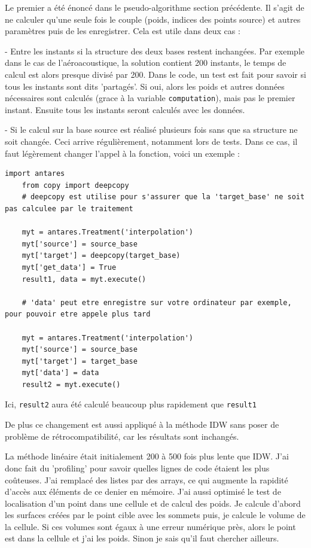 Le premier a été énoncé dans le pseudo-algorithme section précédente. Il s'agit de ne calculer qu'une seule fois le couple (poids, indices des points source) et autres paramètres puis de les enregistrer. Cela est utile dans deux cas :

- Entre les instants si la structure des deux bases restent inchangées. Par exemple dans le cas de l'aéroacoustique, la solution contient 200 instants, le temps de calcul est alors presque divisé par 200. Dans le code, un test est fait pour savoir si tous les instants sont dits 'partagés'. Si oui, alors les poids et autres données nécessaires sont calculés (grace à la variable \texttt{computation}), mais pas le premier instant. Ensuite tous les instants seront calculés avec les données.

- Si le calcul sur la base source est réalisé plusieurs fois sans que sa structure ne soit changée. Ceci arrive régulièrement, notamment lors de tests. Dans ce cas, il faut légèrement changer l'appel à la fonction, voici un exemple :

\begin{lstlisting}[caption=Exemple de réutilisation des données, label={lst:antares}]
    import antares
    from copy import deepcopy
    # deepcopy est utilise pour s'assurer que la 'target_base' ne soit pas calculee par le traitement

    myt = antares.Treatment('interpolation')
    myt['source'] = source_base
    myt['target'] = deepcopy(target_base)
    myt['get_data'] = True
    result1, data = myt.execute()

    # 'data' peut etre enregistre sur votre ordinateur par exemple, pour pouvoir etre appele plus tard

    myt = antares.Treatment('interpolation')
    myt['source'] = source_base
    myt['target'] = target_base
    myt['data'] = data
    result2 = myt.execute()
\end{lstlisting}

Ici, \texttt{result2} aura été calculé beaucoup plus rapidement que \texttt{result1}

De plus ce changement est aussi appliqué à la méthode IDW sans poser de problème de rétrocompatibilité, car les résultats sont inchangés.

\vspace{0.5cm}

La méthode linéaire était initialement 200 à 500 fois plus lente que IDW. J'ai donc fait du 'profiling' pour savoir quelles lignes de code étaient les plus coûteuses. J'ai remplacé des listes par des arrays, ce qui augmente la rapidité d'accès aux éléments de ce denier en mémoire.
J'ai aussi optimisé le test de localisation d'un point dans une cellule et de calcul des poids.
Je calcule d'abord les surfaces créées par le point cible avec les sommets puis, je calcule le volume de la cellule. Si ces volumes sont égaux à une erreur numérique près, alors le point est dans la cellule et j'ai les poids. Sinon je sais qu'il faut chercher ailleurs.

